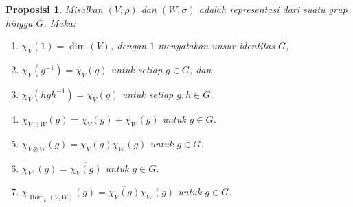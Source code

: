 \documentclass[12pt]{article}
\theoremstyle{plain}
\newtheorem{proposition}[theorem]{Proposisi}
\theoremstyle{definition}
\theoremstyle{remark}
\numberwithin{equation}{section}
\begin{document}
\begin{proposition}
Misalkan $(V,\rho)$ dan $(W,\sigma)$ adalah representasi dari suatu grup hingga
$G$.
Maka:
\begin{enumerate}
\item $\chi_V(1)=\dim(V)$, dengan $1$ menyatakan unsur identitas $G$,
\item $\chi_V(g^{-1}) = \overline{\chi_V(g)}$
untuk setiap $g \in G$, dan
\item $\chi_V(hgh^{-1})=\chi_V(g)$ untuk setiap $g,h \in G$.
\item
$\displaystyle
\chi_{V \oplus W}(g) = \chi_V(g) + \chi_W(g)$ untuk $g \in G$.
\item
$\displaystyle
\chi_{V \otimes W}(g) = \chi_V(g)\chi_W(g)$ untuk $g \in G$.
\item
$\displaystyle
\chi_{V^\vee}(g) =  \overline{\chi_V(g)}$ untuk $g \in G$.
\item
$\displaystyle
\chi_{\operatorname{Hom}_k(V,W)}(g) = \overline{\chi_V(g)} \chi_W(g)$ untuk $g \in G$.
\end{enumerate}
\end{proposition}
\end{document}
